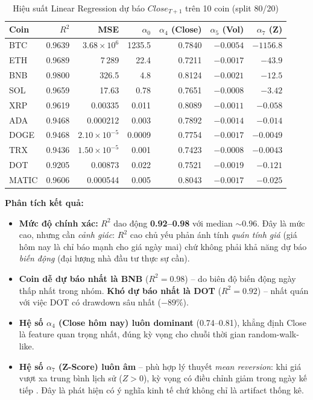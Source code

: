 \begin{table}[H]
\centering
\caption{Hiệu suất Linear Regression dự báo $Close_{T+1}$ trên 10 coin (split 80/20)}
\label{tab:regression_results}
\small
\begin{tabular}{@{}lrrrrrr@{}}
\toprule
\textbf{Coin} & \textbf{$R^2$} & \textbf{MSE} & \textbf{$\alpha_0$} & \textbf{$\alpha_4$ (Close)} & \textbf{$\alpha_5$ (Vol)} & \textbf{$\alpha_7$ (Z)} \\
\midrule
BTC   & 0.9639 & $3.68\times10^6$ & 1235.5  & 0.7840 & $-0.0054$ & $-1156.8$ \\
ETH   & 0.9689 & 7\,289           & 22.4    & 0.7211 & $-0.0017$ & $-43.9$ \\
BNB   & 0.9800 & 326.5            & 4.8     & 0.8124 & $-0.0021$ & $-12.5$ \\
SOL   & 0.9659 & 17.63            & 0.78    & 0.7651 & $-0.0008$ & $-3.42$ \\
XRP   & 0.9619 & 0.00335          & 0.011   & 0.8089 & $-0.0011$ & $-0.058$ \\
ADA   & 0.9468 & 0.000212         & 0.003   & 0.7892 & $-0.0014$ & $-0.014$ \\
DOGE  & 0.9468 & $2.10\times10^{-5}$ & 0.0009 & 0.7754 & $-0.0017$ & $-0.0049$ \\
TRX   & 0.9436 & $1.50\times10^{-5}$ & 0.001 & 0.7423 & $-0.0008$ & $-0.0043$ \\
DOT   & 0.9205 & 0.00873          & 0.022   & 0.7521 & $-0.0019$ & $-0.121$ \\
MATIC & 0.9606 & 0.000544         & 0.005   & 0.8043 & $-0.0017$ & $-0.025$ \\
\bottomrule
\end{tabular}
\end{table}

\textbf{Phân tích kết quả:}
\begin{itemize}
    \item \textbf{Mức độ chính xác:} $R^2$ dao động \textbf{0.92--0.98} với median $\sim 0.96$. Đây là mức cao, nhưng cần \emph{cảnh giác}: $R^2$ cao chủ yếu phản ánh tính \emph{quán tính giá} (giá hôm nay là chỉ báo mạnh cho giá ngày mai) chứ không phải khả năng dự báo \emph{biến động} (đại lượng nhà đầu tư thực sự cần).
    \item \textbf{Coin dễ dự báo nhất là BNB} ($R^2 = 0.98$) -- do biên độ biến động ngày thấp nhất trong nhóm. \textbf{Khó dự báo nhất là DOT} ($R^2 = 0.92$) -- nhất quán với việc DOT có drawdown sâu nhất ($-89\%$).
    \item \textbf{Hệ số $\alpha_4$ (Close hôm nay) luôn dominant} (0.74--0.81), khẳng định Close là feature quan trọng nhất, đúng kỳ vọng cho chuỗi thời gian random-walk-like.
    \item \textbf{Hệ số $\alpha_7$ (Z-Score) luôn âm} -- phù hợp lý thuyết \emph{mean reversion}: khi giá vượt xa trung bình lịch sử ($Z > 0$), kỳ vọng có điều chỉnh giảm trong ngày kế tiếp \cite{hull2017}. Đây là phát hiện có ý nghĩa kinh tế chứ không chỉ là artifact thống kê.
\end{itemize}

